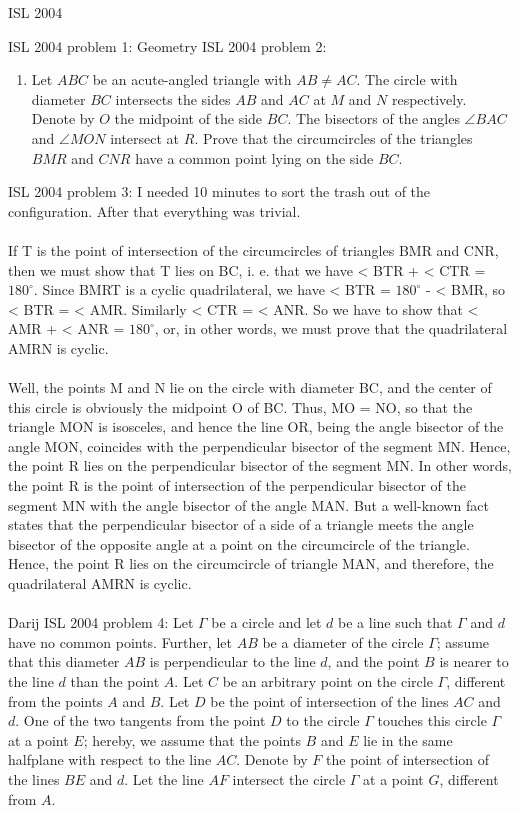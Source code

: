 ISL 2004 

ISL 2004 problem 1:  Geometry 
ISL 2004 problem 2:  \begin{enumerate}
  \item Let $ABC$ be an acute-angled triangle with $AB\neq AC$. The circle with diameter $BC$ intersects the sides $AB$ and $AC$ at $M$ and $N$ respectively. Denote by $O$ the midpoint of the side $BC$. The bisectors of the angles $\angle BAC$ and $\angle MON$ intersect at $R$. Prove that the circumcircles of the triangles $BMR$ and $CNR$ have a common point lying on the side $BC$.
\end{enumerate} 
ISL 2004 problem 3:  I needed 10 minutes to sort the trash out of the configuration. After that everything was trivial. \\\\
If T is the point of intersection of the circumcircles of triangles BMR and CNR, then we must show that T lies on BC, i. e. that we have < BTR + < CTR = $180^{\circ}$. Since BMRT is a cyclic quadrilateral, we have < BTR = $180^{\circ}$ - < BMR, so < BTR = < AMR. Similarly < CTR = < ANR. So we have to show that < AMR + < ANR = $180^{\circ}$, or, in other words, we must prove that the quadrilateral AMRN is cyclic. \\\\
Well, the points M and N lie on the circle with diameter BC, and the center of this circle is obviously the midpoint O of BC. Thus, MO = NO, so that the triangle MON is isosceles, and hence the line OR, being the angle bisector of the angle MON, coincides with the perpendicular bisector of the segment MN. Hence, the point R lies on the perpendicular bisector of the segment MN. In other words, the point R is the point of intersection of the perpendicular bisector of the segment MN with the angle bisector of the angle MAN. But a well-known fact states that the perpendicular bisector of a side of a triangle meets the angle bisector of the opposite angle at a point on the circumcircle of the triangle. Hence, the point R lies on the circumcircle of triangle MAN, and therefore, the quadrilateral AMRN is cyclic. \\\\
Darij 
ISL 2004 problem 4:  Let $\Gamma$ be a circle and let $d$ be a line such that $\Gamma$ and $d$ have no common points. Further, let $AB$ be a diameter of the circle $\Gamma$; assume that this diameter $AB$ is perpendicular to the line $d$, and the point $B$ is nearer to the line $d$ than the point $A$. Let $C$ be an arbitrary point on the circle $\Gamma$, different from the points $A$ and $B$. Let $D$ be the point of intersection of the lines $AC$ and $d$. One of the two tangents from the point $D$ to the circle $\Gamma$ touches this circle $\Gamma$ at a point $E$; hereby, we assume that the points $B$ and $E$ lie in the same halfplane with respect to the line $AC$. Denote by $F$ the point of intersection of the lines $BE$ and $d$. Let the line $AF$ intersect the circle $\Gamma$ at a point $G$, different from $A$. \\\\
